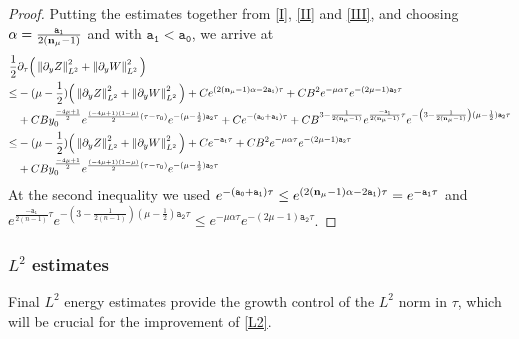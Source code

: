 \documentclass{article}
\newcommand{\norm}[1]{\left\lVert#1\right\rVert}
\newcommand{\al}{\alpha}
\newcommand{\pa}{\partial}
\def\beqa{\begin{equation}\begin{aligned}}
\def\eeqa{\end{aligned}\end{equation}}
\def\espz{Z}
\def\espw{W}
\def\epone{\mathtt{a_1}}
\def\eptwo{\mathtt{a_2}}
\def\epzero{\mathtt{a_0}}
\def\ndmu{{\bf{n}_{\mu}}}
\numberwithin{equation}{section}
\begin{document}
\begin{proof}
         Putting the estimates together from \eqref{I}, \eqref{II} and \eqref{III}, and choosing $\al = \frac{\epone}{2(\ndmu-1)}$ and  with $\epone<\epzero$, we arrive at 
		 \beqa\notag 
\frac12&\pa_\tau \Big(\norm{\pa_y\espz}_{L^2}^2+\norm{\pa_y\espw}_{L^2}^2\Big)\\ 
			\leq & -(\mu-\frac{1}{2} ) \Big(\norm{\pa_y \espz}_{L^2}^2 +\norm{\pa_y \espw}_{L^2} ^2\Big)  + C e^{(2(\ndmu-1)\al-2\epone) \tau} + CB^2 e^{-\mu\al \tau }e^{-(2\mu-1)\eptwo \tau} \\ 
			&
           +CB y_0^{\frac{-4\mu +1}{2}} 
            e^{\frac{(-4\mu+1)(1-\mu)}{2}(\tau-\tau_0)}e^{-(\mu-\frac12)\eptwo\tau} + C e^{-(\epzero+\epone )\tau}%
            + C B^{3-\frac{1}{2(\ndmu-1)}} e^{\frac{-\epone}{2(\ndmu-1)}\tau} e^{-\left(3-\frac{1}{2(\ndmu-1)}\right)(\mu-\frac12)\eptwo \tau}  \\ 
          \leq & -(\mu-\frac{1}{2} ) \Big(\norm{\pa_y \espz}_{L^2}^2 +\norm{\pa_y \espw}_{L^2} ^2\Big)  + C   e^{-\epone \tau} + CB^2 e^{-\mu\al \tau }e^{-(2\mu-1)\eptwo \tau} \\
          &+CB y_0^{\frac{-4\mu +1}{2}} 
            e^{\frac{(-4\mu+1)(1-\mu)}{2}(\tau-\tau_0)}e^{-(\mu-\frac12)\eptwo\tau}
		 \eeqa
        At the second inequality we used   $e^{-(\epzero+\epone )\tau} \le e^{(2(\ndmu-1)\al-2\epone) \tau}  =  e^{-\epone \tau}$ and   $e^{\frac{-\epone}{2(n-1)}\tau} e^{-\left(3-\frac{1}{2(n-1)}\right)(\mu-\frac12)\eptwo \tau}  \le e^{-\mu\al \tau }e^{-(2\mu-1)\eptwo \tau} $. 
		 \end{proof}


\subsubsection{$L^2$ estimates}

Final $L^2$ energy estimates provide the growth control of the $L^2$ norm in $\tau$, which will be crucial for the improvement of \eqref{L2}. 
\end{document}
